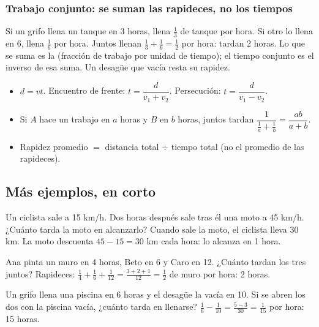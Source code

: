 
\subsubsection{Trabajo conjunto: se suman las rapideces, no los tiempos}
Si un grifo llena un tanque en 3 horas, llena $\tfrac13$ de tanque por hora. Si otro lo llena en 6, llena $\tfrac16$ por
hora. Juntos llenan $\tfrac13 + \tfrac16 = \tfrac12$ por hora: tardan 2 horas. Lo que se suma es la 
(fracción de trabajo por unidad de tiempo); el tiempo conjunto es el inverso de esa suma. Un desagüe que vacía resta su
rapidez.

\begin{regla}
\begin{itemize}
  \item $d = v t$. Encuentro de frente: $t = \dfrac{d}{v_1 + v_2}$. Persecución: $t = \dfrac{d}{v_1 - v_2}$.
  \item Si $A$ hace un trabajo en $a$ horas y $B$ en $b$ horas, juntos tardan
  $\dfrac{1}{\frac1a + \frac1b} = \dfrac{ab}{a + b}$.
  \item Rapidez promedio $=$ distancia total $\div$ tiempo total (no el promedio de las rapideces).
\end{itemize}
\end{regla}

\subsection{Más ejemplos, en corto}
\begin{ejemplo}[Persecución]
Un ciclista sale a 15 km/h. Dos horas después sale tras él una moto a 45 km/h. ¿Cuánto tarda la moto en alcanzarlo?
\solucion Cuando sale la moto, el ciclista lleva 30 km. La moto descuenta $45 - 15 = 30$ km cada hora: lo alcanza en
1 hora.
\end{ejemplo}

\begin{ejemplo}
Ana pinta un muro en 4 horas, Beto en 6 y Caro en 12. ¿Cuánto tardan los tres juntos?
\solucion Rapideces: $\tfrac14 + \tfrac16 + \tfrac{1}{12} = \tfrac{3 + 2 + 1}{12} = \tfrac12$ de muro por hora: 2 horas.
\end{ejemplo}

\begin{ejemplo}
Un grifo llena una piscina en 6 horas y el desagüe la vacía en 10. Si se abren los dos con la piscina vacía, ¿cuánto
tarda en llenarse?
\solucion $\tfrac16 - \tfrac1{10} = \tfrac{5 - 3}{30} = \tfrac{1}{15}$ por hora: 15 horas.
\end{ejemplo}

